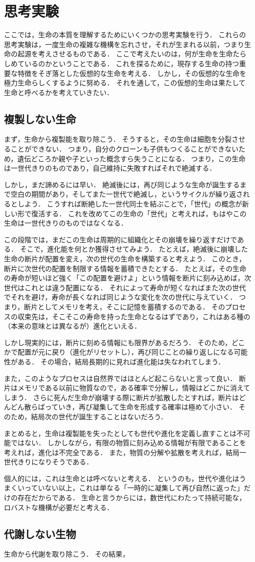 \section{思考実験}
ここでは，生命の本質を理解するためにいくつかの思考実験を行う．
これらの思考実験は，一度生命の複雑な機構を忘れさせ，それが生まれる以前，つまり生命の起源を考えさせるものである．
ここで考えたいのは，何が生命を生命たらしめているのかということである．
これを探るために，現存する生命の持つ重要な特徴をそぎ落とした仮想的な生命を考える．
しかし，その仮想的な生命を極力生命らしくするように努める．
それを通して，この仮想的生命は果たして生命と呼べるかを考えていきたい．

\subsection{複製しない生命}
まず，生命から複製能を取り除こう．
そうすると，その生命は細胞を分裂させることができない．
つまり，自分のクローンも子供もつくることができないため，遺伝どころか親や子といった概念すら失うことになる．
つまり，この生命は一世代きりのものであり，自己維持に失敗すればそれで絶滅する．

しかし，まだ諦めるには早い．
絶滅後には，再び同じような生命が誕生するまで空白の期間があり，そしてまた一世代で絶滅し，というサイクルが繰り返されるとしよう．
こうすれば断絶した一世代同士を結ぶことで，「世代」の概念が新しい形で復活する．
これを改めてこの生命の「世代」と考えれば，もはやこの生命は一世代きりのものではなくなる．

この段階では，まだこの生命は周期的に組織化とその崩壊を繰り返すだけである．
そこで，進化能を何とか獲得させてみよう．
たとえば，絶滅後に崩壊した生命の断片が配置を変え，次の世代の生命を構築すると考えよう．
このとき，断片に次世代の配置を制限する情報を蓄積できたとする．
たとえば，その生命の寿命が短いほど強く「この配置を避けよ」という情報を断片に刻み込めば，次世代はこれとは違う配置になる．
それによって寿命が短くなればまた次の世代でそれを避け，寿命が長くなれば同じような変化を次の世代に与えていく．
つまり，断片としてメモリを考え，そこに記憶を蓄積するのである．
そのプロセスの収束先は，そこそこの寿命を持った生命となるはずであり，これはある種の（本来の意味とは異なるが）進化といえる．

しかし現実的には，断片に刻める情報にも限界があるだろう．
そのため，どこかで配置が元に戻り（進化がリセットし），再び同じことの繰り返しになる可能性がある．
その場合，結局長期的に見れば進化能は失なわれてしまう．

また，このようなプロセスは自然界ではほとんど起こらないと言って良い．
断片はメモリである以前に物質なので，ある確率で分解し，情報はどこかに消えてしまう．
さらに死んだ生命が崩壊する際に断片が拡散したとすれば，断片はどんどん散らばっていき，再び凝集して生命を形成する確率は極めて小さい．
そのため，結局次の世代が誕生することはないだろう．

まとめると，生命は複製能を失ったとしても世代や進化を定義し直すことは不可能ではない．
しかしながら，有限の物質に刻み込める情報が有限であることを考えれば，進化は不完全である．
また，物質の分解や拡散を考えれば，結局一世代きりになりそうである．

個人的には，これは生命とは呼べないと考える．
というのも，世代や進化はうまくいっていない以上，これは単なる「一時的に凝集して再び自然に返った」だけの存在だからである．
生命と言うからには，数世代にわたって持続可能な，ロバストな機構が必要だと考える．

\subsection{代謝しない生物}
生命から代謝を取り除こう．
その結果，
